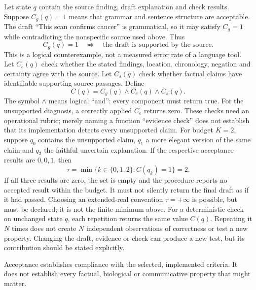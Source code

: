 Let state $q$ contain the source finding, draft explanation and check results. Suppose $C_g(q)=1$ means that grammar and sentence structure are acceptable. The draft ``This scan confirms cancer'' is grammatical, so it may satisfy $C_g=1$ while contradicting the nonspecific source used above. Thus
\[
C_g(q)=1\quad\not\Rightarrow\quad\text{the draft is supported by the source}.
\]
This is a logical counterexample, not a measured error rate of a language tool.
Let $C_e(q)$ check whether the stated findings, location, chronology, negation and certainty agree with the source. Let $C_s(q)$ check whether factual claims have identifiable supporting source passages. Define
\[
C(q)=C_g(q)\land C_e(q)\land C_s(q).
\]
The symbol $\land$ means logical ``and'': every component must return true. For the unsupported diagnosis, a correctly applied $C_e$ returns zero. These checks need an operational rubric; merely naming a function ``evidence check'' does not establish that its implementation detects every unsupported claim.
For budget $K=2$, suppose $q_0$ contains the unsupported claim, $q_1$ a more elegant version of the same claim and $q_2$ the faithful uncertain explanation. If the respective acceptance results are $0,0,1$, then
\[
\tau=\min\{k\in\{0,1,2\}:C(q_k)=1\}=2.
\]
If all three results are zero, the set is empty and the procedure reports no accepted result within the budget. It must not silently return the final draft as if it had passed. Choosing an extended-real convention $\tau=+\infty$ is possible, but must be declared; it is not the finite minimum above.
For a deterministic check on unchanged state $q$, each repetition returns the same value $C(q)$. Repeating it $N$ times does not create $N$ independent observations of correctness or test a new property. Changing the draft, evidence or check can produce a new test, but its contribution should be stated explicitly.

Acceptance establishes compliance with the selected, implemented criteria. It does not establish every factual, biological or communicative property that might matter.
